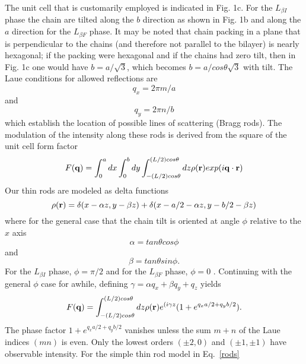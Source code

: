 \documentclass[
 preprint,
 showkeys, 
 amsmath,
 amssymb,
 aps,
]{revtex4-1}
\begin{document}
The unit cell that is customarily employed is indicated in Fig. 1c.  For the $L_{{\beta}I}$ phase the chain are tilted along the $b$ direction as shown in Fig. 1b and along the $a$ direction for the $L_{{\beta}F}$ phase.  It may be noted that chain packing in a plane that is perpendicular to the chains (and therefore not parallel to the bilayer) is nearly hexagonal; if the packing were hexagonal and if the chains had zero tilt, then in Fig. 1c one would have $b=a/\sqrt{3}$, which becomes $b=a/cos{\theta}\sqrt{3}$ with tilt.  The Laue conditions for allowed reflections are 
\begin{equation}\label{Laue1}
q_x=2{\pi}m/a 
\end{equation}
and
\begin{equation}\label{Laue2}
q_y=2{\pi}n/b 
\end{equation}
which establish the location of possible lines of scattering (Bragg rods). The modulation of the intensity along these rods is derived from the square of the unit cell form factor
\begin{equation}\label{S(q)}
F(\bold{q}) = \int_{0}^{a}dx\int_{0}^{b}dy\int_{-(L/2)cos{\theta}}^{(L/2)cos{\theta}}dz\rho(\bold{r})exp(i\bold{q}\cdot\bold{r})
\end{equation}
Our thin rods are modeled as delta functions
\begin{equation}\label{rods}
\rho(\bold{r})=\delta(x-{\alpha}z,y-{\beta}z)+\delta(x-a/2-{\alpha}z,y-b/2-{\beta}z)
\end{equation}
where for the general case that the chain tilt is oriented at angle $\phi$ relative to the $x$ axis 
\begin{equation}\label{alpha}
\alpha=tan{\theta}cos{\phi}
\end{equation}
and
\begin{equation}\label{beta}
\beta=tan{\theta}sin{\phi}.
\end{equation}
For the $L_{{\beta}I}$ phase, $\phi={\pi}/2$ and for the $L_{{\beta}F}$ phase, $\phi=0$ .  Continuing with the general $\phi$ case for awhile,
defining $\gamma = {\alpha}q_x+{\beta}q_y+q_z$ yields
\begin{equation}\label{S(q)}
F(\bold{q}) = \int_{-(L/2)cos{\theta}}^{(L/2)cos{\theta}}dz\rho(\bold{r})e^{(i{\gamma}z}(1+e^{q_xa/2+q_yb/2}).
\end{equation}
The phase factor $1+e^{q_xa/2+q_yb/2}$ vanishes unless the sum $m+n$ of the Laue indices $(mn)$ is even. Only the lowest orders $(\pm2,0)$ and $(\pm1,\pm1)$ have observable intensity.  For the simple thin rod model in Eq.~\ref{rods} 
\end{document}
